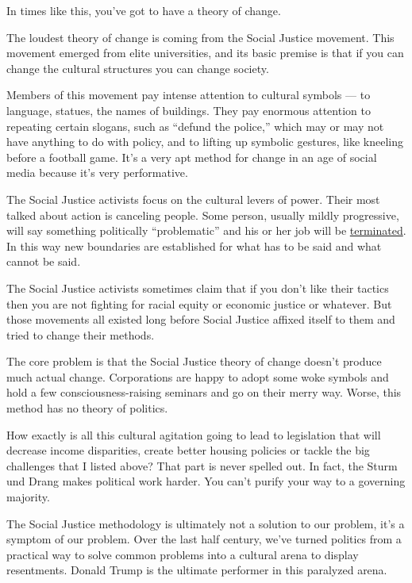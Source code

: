 In times like this, you've got to have a theory of change.

The loudest theory of change is coming from the Social Justice movement.
This movement emerged from elite universities, and its basic premise is
that if you can change the cultural structures you can change society.

Members of this movement pay intense attention to cultural symbols ---
to language, statues, the names of buildings. They pay enormous
attention to repeating certain slogans, such as ``defund the police,''
which may or may not have anything to do with policy, and to lifting up
symbolic gestures, like kneeling before a football game. It's a very apt
method for change in an age of social media because it's very
performative.

The Social Justice activists focus on the cultural levers of power.
Their most talked about action is canceling people. Some person, usually
mildly progressive, will say something politically ``problematic'' and
his or her job will be
\href{https://nymag.com/intelligencer/2020/06/case-for-liberalism-tom-cotton-new-york-times-james-bennet.html}{terminated}.
In this way new boundaries are established for what has to be said and
what cannot be said.

The Social Justice activists sometimes claim that if you don't like
their tactics then you are not fighting for racial equity or economic
justice or whatever. But those movements all existed long before Social
Justice affixed itself to them and tried to change their methods.

The core problem is that the Social Justice theory of change doesn't
produce much actual change. Corporations are happy to adopt some woke
symbols and hold a few consciousness-raising seminars and go on their
merry way. Worse, this method has no theory of politics.

How exactly is all this cultural agitation going to lead to legislation
that will decrease income disparities, create better housing policies or
tackle the big challenges that I listed above? That part is never
spelled out. In fact, the Sturm und Drang makes political work harder.
You can't purify your way to a governing majority.

The Social Justice methodology is ultimately not a solution to our
problem, it's a symptom of our problem. Over the last half century,
we've turned politics from a practical way to solve common problems into
a cultural arena to display resentments. Donald Trump is the ultimate
performer in this paralyzed arena.

